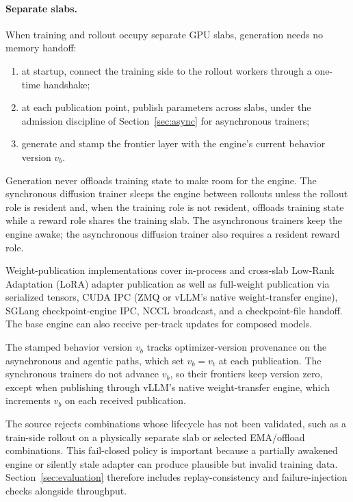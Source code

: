 \documentclass[10pt]{article}
\begin{document}
\paragraph{Separate slabs.}
When training and rollout occupy separate GPU slabs, generation needs no memory handoff:
\begin{enumerate}
  \item at startup, connect the training side to the rollout workers through a one-time handshake;
  \item at each publication point, publish parameters across slabs, under the admission discipline of Section~\ref{sec:async} for asynchronous trainers;
  \item generate and stamp the frontier layer with the engine's current behavior version $v_b$.
\end{enumerate}
Generation never offloads training state to make room for the engine.
The synchronous diffusion trainer sleeps the engine between rollouts unless the rollout role is resident and, when the training role is not resident, offloads training state while a reward role shares the training slab.
The asynchronous trainers keep the engine awake; the asynchronous diffusion trainer also requires a resident reward role.

Weight-publication implementations cover in-process and cross-slab Low-Rank Adaptation (LoRA) adapter publication as well as full-weight publication via serialized tensors, CUDA IPC (ZMQ or vLLM's native weight-transfer engine), SGLang checkpoint-engine IPC, NCCL broadcast, and a checkpoint-file handoff.
The base engine can also receive per-track updates for composed models.

The stamped behavior version $v_b$ tracks optimizer-version provenance on the asynchronous and agentic paths, which set $v_b = v_t$ at each publication.
The synchronous trainers do not advance $v_b$, so their frontiers keep version zero, except when publishing through vLLM's native weight-transfer engine, which increments $v_b$ on each received publication.

The source rejects combinations whose lifecycle has not been validated, such as a train-side rollout on a physically separate slab or selected EMA/offload combinations.
This fail-closed policy is important because a partially awakened engine or silently stale adapter can produce plausible but invalid training data.
Section~\ref{sec:evaluation} therefore includes replay-consistency and failure-injection checks alongside throughput.
\end{document}
